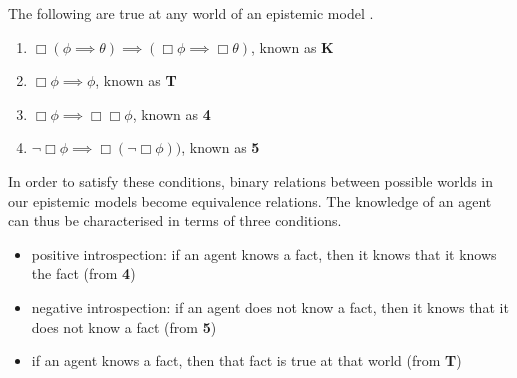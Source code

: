 \begin{propn}
	The following are true at any world of an epistemic model
	\cite{hoek2008dynamic}.
	\begin{enumerate}
		\item $\Box (\phi \implies \theta) \implies (\Box \phi \implies \Box
				\theta)$, known as {\bf K}
		\item $\Box \phi \implies \phi$, known as {\bf T}
		\item $\Box \phi \implies \Box \Box \phi$, known as {\bf 4}
		\item $\neg \Box \phi \implies \Box (\neg \Box \phi))$, known as {\bf 5}
	\end{enumerate}
\end{propn}

In order to satisfy these conditions, binary relations between possible worlds
in our epistemic models become equivalence relations.
The knowledge of an agent can thus be characterised in terms of three
conditions.

\begin{itemize}
  \item positive introspection: if an agent knows a fact, then it knows that it knows the fact (from
      {\bf 4})
  \item negative introspection: if an agent does not know a fact, then it knows that it does not know a
  fact (from {\bf 5})
  \item if an agent knows a fact, then that fact is true at that world (from
      {\bf T})
\end{itemize}

